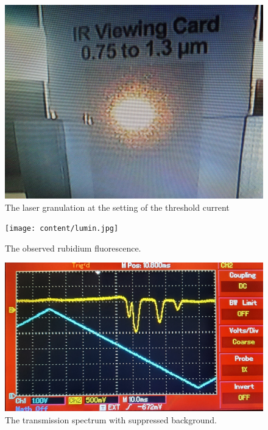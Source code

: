 \begin{figure}[H]
  \centering
  \includegraphics[width=.8\textwidth]{content/laser_card.jpeg}
  \caption{The laser granulation at the setting of the threshold current}
  \label{fig:laser}
\end{figure}
\begin{figure}[H]
  \centering
  \texttt{[image: content/lumin.jpg]}
  \caption{The observed rubidium fluorescence.}
  \label{fig:lumin}
\end{figure}
\begin{figure}[H]
  \centering
  \includegraphics[width=.9\textwidth]{content/peaks.jpg}
  \caption{The transmission spectrum with suppressed background.}
  \label{fig:peaks}
\end{figure}

